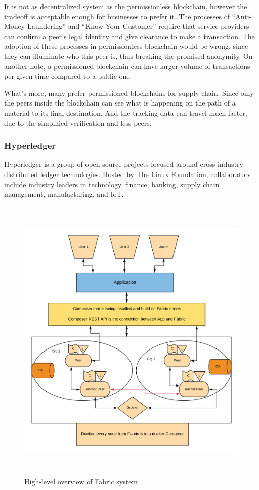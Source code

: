 \documentclass[a4paper,11pt]{report}
\begin{document}
	It is not as decentralized system as the permissionless blockchain, however the tradeoff is acceptable enough for businesses to prefer it. The processes of “Anti-Money Laundering” and “Know Your Customer” require that service providers can confirm a peer’s legal identity and give clearance to make a transaction. The adoption of these processes in permissionless blockchain would be wrong, since they can illuminate who this peer is, thus breaking the promised anonymity. On another note, a permissioned blockchain can have larger volume of transactions per given time compared to a public one. 
	
What’s more, many prefer permissioned blockchains for supply chain. Since only the peers inside the blockchain can see what is happening on the path of a material to its final destination. And the tracking data can travel much faster, due to the simplified verification and less peers. 

\subsubsection{Hyperledger}
Hyperledger is a group of open source projects focused around cross-industry distributed ledger technologies. Hosted by The Linux Foundation, collaborators include industry leaders in technology, finance, banking, supply chain management, manufacturing, and IoT.


\begin{figure}[h]
\centering
  \includegraphics[height=14cm,width=16cm]{Flowdiagram.png}
  \caption{High-level overview of Fabric system}
  \label{highleveloverview}
\end{figure}
\end{document}
